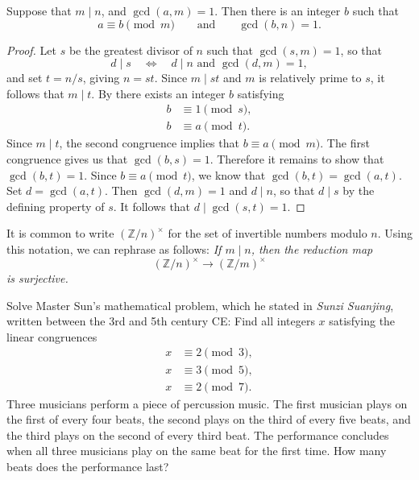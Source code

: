 \begin{theorem}\label{theorem:unit-surjectivity-mod}
  Suppose that $m\mid n$, and $\gcd(a,m)=1$. Then there is an integer $b$ such that
  \begin{equation*}
    a\equiv b\pmod{m}\qquad\text{and}\qquad \gcd(b,n)=1.
  \end{equation*}
\end{theorem}

\begin{proof}
  Let $s$ be the greatest divisor of $n$ such that $\gcd(s,m)=1$, so that
  \begin{equation*}
    d\mid s \quad\Leftrightarrow\quad d\mid n\text{ and }\gcd(d,m)=1,
  \end{equation*}
  and set $t=n/s$, giving $n=st$. Since $m\mid st$ and $m$ is relatively prime to $s$, it follows that $m\mid t$. By  there exists an integer $b$ satisfying
  \begin{align*}
    b & \equiv 1 \pmod{s}, \\
    b & \equiv a \pmod{t}. 
  \end{align*}
  Since $m\mid t$, the second congruence implies that $b\equiv a\pmod{m}$. The first congruence gives us that $\gcd(b,s)=1$. Therefore it remains to show that $\gcd(b,t)=1$. Since $b\equiv a\pmod{t}$, we know that $\gcd(b,t)=\gcd(a,t)$. Set $d=\gcd(a,t)$. Then $\gcd(d,m)=1$ and $d\mid n$, so that $d\mid s$ by the defining property of $s$. It follows that $d\mid \gcd(s,t)=1$.
\end{proof}

\begin{remark}
  It is common to write $(\mathbb{Z}/n)^{\times}$ for the set of invertible numbers modulo $n$. Using this notation, we can rephrase  as follows: 
  \begingroup\em If $m\mid n$, then the reduction map
  \begin{equation*}
    (\mathbb{Z}/n)^{\times} \to (\mathbb{Z}/m)^{\times}
  \end{equation*}
  is surjective.
  \endgroup
\end{remark}

\exercises

\begin{starter}
  \exercise Solve Master Sun's mathematical problem, which he stated in \emph{Sunzi Suanjing}, written between the 3rd and 5th century CE: Find all integers $x$ satisfying the linear congruences
  \begin{align*}
    x & \equiv 2 \pmod{3},\\
    x & \equiv 3 \pmod{5},\\
    x & \equiv 2 \pmod{7}.
  \end{align*}
  \exercise Three musicians perform a piece of percussion music. The first musician plays on the first of every four beats, the second plays on the third of every five beats, and the third plays on the second of every third beat. The performance concludes when all three musicians play on the same beat for the first time. How many beats does the performance last?
\end{starter}

